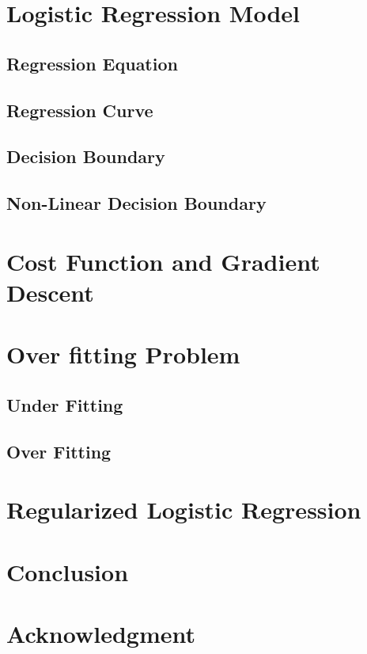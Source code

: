 \documentclass[conference]{IEEEtran}
\begin{document}
\section{Logistic Regression Model}

\subsection{Regression Equation}

\subsection{Regression Curve}
\subsection{Decision Boundary}
\subsection{Non-Linear Decision Boundary}

\section{Cost Function and Gradient Descent}

\section{Over fitting Problem}
\subsection{Under Fitting}
\subsection{Over Fitting}

\section{Regularized Logistic Regression}

\section{Conclusion}


\section*{Acknowledgment}
\end{document}
